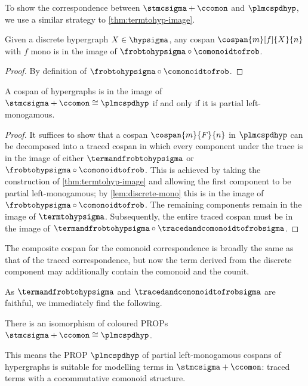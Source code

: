 To show the correspondence between \(\stmcsigma + \ccomon\) and
\(\plmcspdhyp\), we use a similar strategy to \cref{thm:termtohyp-image}.

\begin{lemma}\label{lem:discrete-mono}
    Given a discrete hypergraph \(X \in \hypsigma\), any cospan
    \(\cospan{m}[f]{X}{n}\) with \(f\) mono is in the image of
    \(\frobtohypsigma \circ \comonoidtofrob\).
\end{lemma}
\begin{proof}
    By definition of \(\frobtohypsigma \circ \comonoidtofrob\).
\end{proof}

\begin{theorem}\label{thm:comonoid-fully-complete}
    A cospan of hypergraphs is in the image of
    \(\stmcsigma + \ccomon \cong \plmcspdhyp\) if and only if it is partial
    left-monogamous.
\end{theorem}
\begin{proof}
    It suffices to show that a cospan \(\cospan{m}{F}{n}\) in
    \(\plmcspdhyp\) can be decomposed into a traced cospan in which every
    component under the trace is in the image of either
    \(\termandfrobtohypsigma\) or \(\frobtohypsigma \circ \comonoidtofrob\).
    This is achieved by taking the construction of \cref{thm:termtohyp-image}
    and allowing the first component to be partial left-monogamous; by
    \cref{lem:discrete-mono} this is in the image of
    \(\frobtohypsigma \circ \comonoidtofrob\).
    The remaining components remain in the image of \(\termtohypsigma\).
    Subsequently, the entire traced cospan must be in the image of \(
    \termandfrobtohypsigma \circ \tracedandcomonoidtofrobsigma
    \).
\end{proof}

The composite cospan for the comonoid correspondence is broadly the same as that
of the traced correspondence, but now the term derived from the discrete
component may additionally contain the comonoid and the counit.

As \(\termandfrobtohypsigma\) and \(\tracedandcomonoidtofrobsigma\) are
faithful, we immediately find the following.

\begin{corollary}
    There is an isomorphism of coloured PROPs
    \(\stmcsigma + \ccomon \cong \plmcspdhyp\).
\end{corollary}

This means the PROP \(\plmcspdhyp\) of partial left-monogamous cospans of
hypergraphs is suitable for modelling terms in \(\stmcsigma + \ccomon\):
traced terms with a cocommutative comonoid structure.

